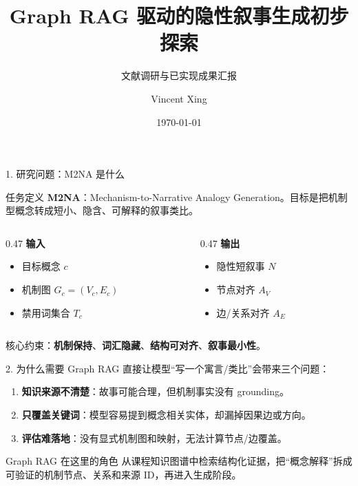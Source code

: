 \documentclass[aspectratio=169,UTF8]{ctexbeamer}
\title[Graph RAG 组会汇报]{Graph RAG 驱动的隐性叙事生成初步探索}
\subtitle{文献调研与已实现成果汇报}
\author{Vincent Xing}
\institute{AAAI-Fable / M2NA 项目}
\date{\today}
\begin{document}
\begin{frame}
  \titlepage
\end{frame}

\begin{frame}{1. 研究问题：M2NA 是什么}
  \begin{block}{任务定义}
    \textbf{M2NA}：Mechanism-to-Narrative Analogy Generation。目标是把机制型概念转成短小、隐含、可解释的叙事类比。
  \end{block}

  \vspace{0.5em}
  \begin{columns}[T,onlytextwidth]
    \begin{column}{0.47\textwidth}
      \textbf{输入}
      \begin{itemize}
        \item 目标概念 $c$
        \item 机制图 $G_c=(V_c,E_c)$
        \item 禁用词集合 $T_c$
      \end{itemize}
    \end{column}
    \begin{column}{0.47\textwidth}
      \textbf{输出}
      \begin{itemize}
        \item 隐性短叙事 $N$
        \item 节点对齐 $A_V$
        \item 边/关系对齐 $A_E$
      \end{itemize}
    \end{column}
  \end{columns}

  \vspace{0.5em}
  核心约束：\textbf{机制保持}、\textbf{词汇隐藏}、\textbf{结构可对齐}、\textbf{叙事最小性}。
\end{frame}

\begin{frame}{2. 为什么需要 Graph RAG}
  直接让模型“写一个寓言/类比”会带来三个问题：

  \begin{enumerate}
    \item \textbf{知识来源不清楚}：故事可能合理，但机制事实没有 grounding。
    \item \textbf{只覆盖关键词}：模型容易提到概念相关实体，却漏掉因果边或方向。
    \item \textbf{评估难落地}：没有显式机制图和映射，无法计算节点/边覆盖。
  \end{enumerate}

  \vspace{0.8em}
  \begin{block}{Graph RAG 在这里的角色}
    从课程知识图谱中检索结构化证据，把“概念解释”拆成可验证的机制节点、关系和来源 ID，再进入生成阶段。
  \end{block}
\end{frame}
\end{document}
